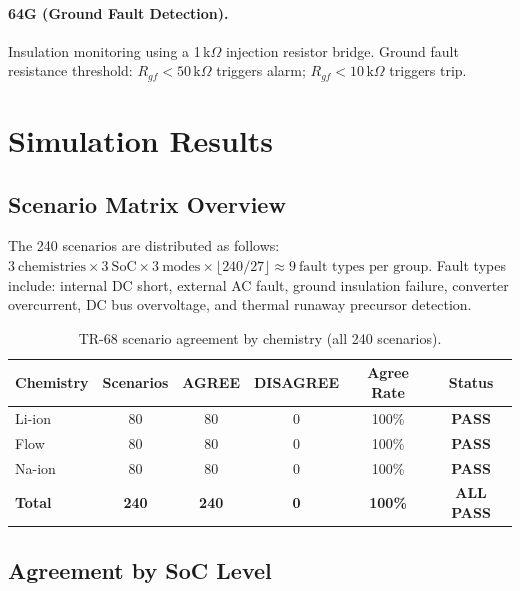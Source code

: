 \documentclass[11pt, a4paper]{article}
\begin{document}
\paragraph{64G (Ground Fault Detection).}
Insulation monitoring using a 1\,k$\Omega$ injection resistor bridge.
Ground fault resistance threshold: $R_{gf} < 50\,\mathrm{k}\Omega$ triggers alarm;
$R_{gf} < 10\,\mathrm{k}\Omega$ triggers trip.

\section{Simulation Results}
\label{sec:results}

\subsection{Scenario Matrix Overview}

The 240 scenarios are distributed as follows:
$3~\text{chemistries} \times 3~\text{SoC} \times 3~\text{modes}
\times \lfloor 240/27 \rfloor \approx 9~\text{fault types per group}$.
Fault types include: internal DC short, external AC fault, ground insulation
failure, converter overcurrent, DC bus overvoltage, and thermal runaway
precursor detection.

\begin{table}[ht]
\centering
\caption{TR-68 scenario agreement by chemistry (all 240 scenarios).}
\label{tab:chemistry_agree}
\begin{tabular}{lccccc}
\toprule
Chemistry & Scenarios & AGREE & DISAGREE & Agree Rate & Status \\
\midrule
Li-ion   & 80 & 80 & 0 & 100\% & \textbf{\color{okgreen}PASS} \\
Flow     & 80 & 80 & 0 & 100\% & \textbf{\color{okgreen}PASS} \\
Na-ion   & 80 & 80 & 0 & 100\% & \textbf{\color{okgreen}PASS} \\
\midrule
\textbf{Total} & \textbf{240} & \textbf{240} & \textbf{0}
  & \textbf{100\%} & \textbf{\color{okgreen}ALL PASS} \\
\bottomrule
\end{tabular}
\end{table}

\subsection{Agreement by SoC Level}
\end{document}
